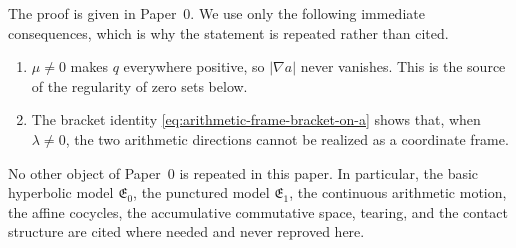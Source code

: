 The proof is given in Paper~0.  We use only the following immediate consequences,
which is why the statement is repeated rather than cited.

\begin{enumerate}
  \item $\mu\ne0$ makes $q$ everywhere positive, so $|\nabla a|$ never vanishes.
  This is the source of the regularity of zero sets below.
  \item The bracket identity \eqref{eq:arithmetic-frame-bracket-on-a} shows that,
  when $\lambda\ne0$, the two arithmetic directions cannot be realized as a
  coordinate frame.
\end{enumerate}

No other object of Paper~0 is repeated in this paper.  In particular, the basic
hyperbolic model $\mathfrak E_0$, the punctured model $\mathfrak E_1$, the
continuous arithmetic motion, the affine cocycles, the accumulative commutative
space, tearing, and the contact structure are cited where needed and never
reproved here.
